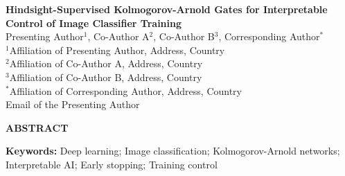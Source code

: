\documentclass[11pt,a4paper]{article}
\begin{document}
\begin{center}
{\fontsize{14}{17}\selectfont \textbf{Hindsight-Supervised Kolmogorov-Arnold Gates for Interpretable Control of Image Classifier Training}}\\[10pt]
{\fontsize{12}{14}\selectfont Presenting Author$^{1}$, Co-Author A$^{2}$, Co-Author B$^{3}$, Corresponding Author$^{*}$}\\[6pt]
{\fontsize{10}{12}\selectfont
$^{1}$Affiliation of Presenting Author, Address, Country\\
$^{2}$Affiliation of Co-Author A, Address, Country\\
$^{3}$Affiliation of Co-Author B, Address, Country\\
$^{*}$Affiliation of Corresponding Author, Address, Country\\
Email of the Presenting Author}
\end{center}
\vspace{6pt}
{\fontsize{11}{13}\selectfont \textbf{ABSTRACT}}\par\vspace{4pt}
{\fontsize{11}{13}\selectfont\onehalfspacing\par}
\vspace{6pt}
{\fontsize{11}{13}\selectfont \textbf{Keywords:} Deep learning; Image classification; Kolmogorov-Arnold networks; Interpretable AI; Early stopping; Training control}
\end{document}
